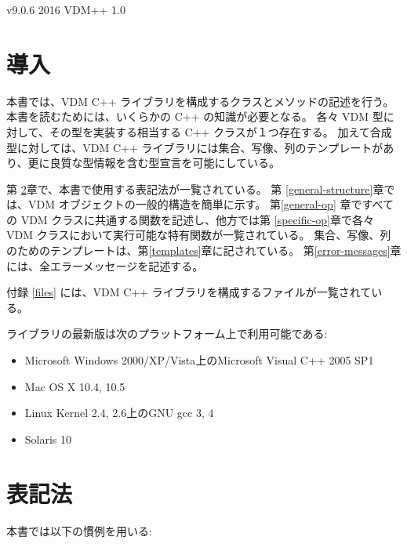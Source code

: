 \documentclass[\pformat,12pt]{jarticle}
\begin{document}
       {v9.0.6}
       {2016}
       {VDM++}
       {1.0}

\section{導入}

本書では、VDM C++ ライブラリを構成するクラスとメソッドの記述を行う。
本書を読むためには、いくらかの C++ の知識が必要となる。
各々 VDM 型に対して、その型を実装する相当する C++ クラスが１つ存在する。
加えて合成型に対しては、VDM C++ ライブラリには集合、写像、列のテンプレートがあり、更に良質な型情報を含む型宣言を可能にしている。

第 \ref{conventions}章で、本書で使用する表記法が一覧されている。
第 \ref{general-structure}章では、VDM オブジェクトの一般的構造を簡単に示す。
第\ref{general-op} 章ですべての VDM クラスに共通する関数を記述し、他方では第 \ref{specific-op}章で各々 VDM クラスにおいて実行可能な特有関数が一覧されている。 
集合、写像、列のためのテンプレートは、第\ref{templates}章に記されている。
第\ref{error-messages}章には、全エラーメッセージを記述する。

付録 \ref{files} には、VDM C++ ライブラリを構成するファイルが一覧されている。

ライブラリの最新版は次のプラットフォーム上で利用可能である:
\begin{itemize}
\item Microsoft Windows 2000/XP/Vista上のMicrosoft Visual C++ 2005 SP1
\item Mac OS X 10.4, 10.5
\item Linux Kernel 2.4, 2.6上のGNU gcc 3, 4
\item Solaris 10
\end{itemize}


\section{表記法} 
\label{conventions}
本書では以下の慣例を用いる:

\vspace{0.5cm}
\end{document}
